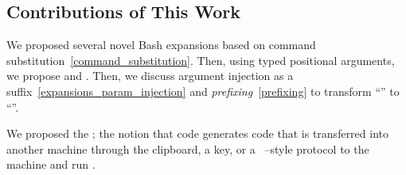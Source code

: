 \subsection{Contributions of This Work}\label{contributions}

We proposed several novel Bash expansions based on command substitution~\ref{command_substitution}. Then, using typed positional arguments, we propose  and . Then, we discuss argument injection as a suffix~\ref{expansions_param_injection} and \emph{prefixing}~\ref{prefixing} to transform ``'' to ``''. 

We proposed the ; the notion that code generates code that is transferred into another machine through the clipboard, a key, or a ~\cite{scp}--style protocol to  the machine and run . 